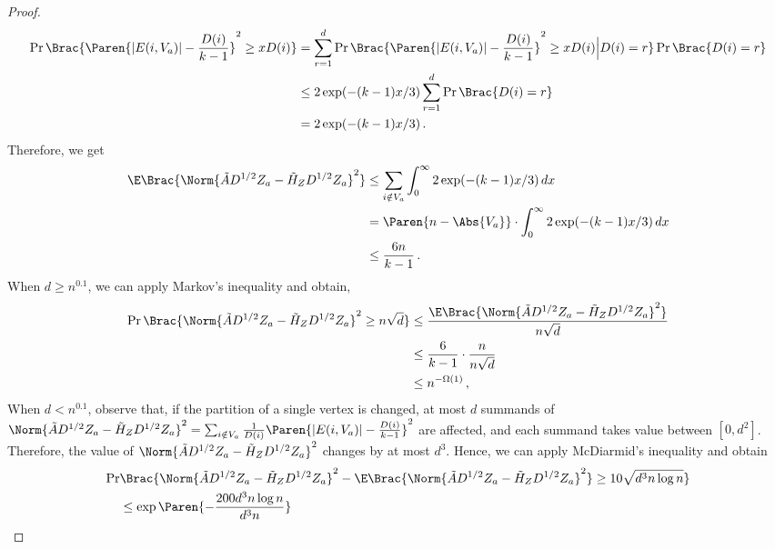 \begin{proof}
    \begin{align*}
        \Pr \Brac{\Paren{|E(i, V_a)| - \frac{D(i)}{k-1}}^2 \geq x D(i)}
        & = \sum_{r=1}^{d} \Pr \Brac{\Paren{|E(i, V_a)| - \frac{D(i)}{k-1}}^2 \geq x D(i) \Big | D(i)=r} \Pr \Brac{D(i)=r} \\
        & \leq 2 \exp(- (k-1)x /3) \sum_{r=1}^{d} \Pr \Brac{D(i)=r} \\
        & = 2 \exp(- (k-1)x /3) \,.
    \end{align*}
    Therefore, we get
    \begin{align*}
        \E \Brac{\Norm{\tilde{A} D^{1/2} Z_a - \tilde{H}_Z D^{1/2} Z_a}^2}
        & \leq \sum_{i \notin V_a} \int_{0}^{\infty} 2 \exp(- (k-1)x /3) \,d x \\
        & = \Paren{n-\Abs{V_a}} \cdot \int_{0}^{\infty} 2 \exp(- (k-1)x /3) \,d x \\
        & \leq \frac{6 n}{k-1} \,.
    \end{align*}
    When $d \geq n^{0.1}$, we can apply Markov's inequality and obtain,
    \begin{align}
    \label{eq:random_planting_subspace_inclusion_4}
    \begin{split}
        \Pr \Brac{\Norm{\tilde{A} D^{1/2} Z_a - \tilde{H}_Z D^{1/2} Z_a}^2 \geq n \sqrt{d}}
        & \leq \frac{\E \Brac{\Norm{\tilde{A} D^{1/2} Z_a - \tilde{H}_Z D^{1/2} Z_a}^2}}{n \sqrt{d}} \\
        & \leq \frac{6}{k-1} \cdot \frac{n}{n \sqrt{d}} \\
        & \leq n^{-\Omega(1)} \,,
    \end{split}
    \end{align}
    When $d < n^{0.1}$, observe that, if the partition of a single vertex is changed, at most $d$ summands of $\Norm{\tilde{A} D^{1/2} Z_a - \tilde{H}_Z D^{1/2} Z_a}^2 = \sum_{i \notin V_a} \frac{1}{D(i)}\Paren{|E(i, V_a)| - \frac{D(i)}{k-1}}^2$ are affected, and each summand takes value between $[0, d^2]$. Therefore, the value of $\Norm{\tilde{A} D^{1/2} Z_a - \tilde{H}_Z D^{1/2} Z_a}^2$ changes by at most $d^3$. Hence, we can apply McDiarmid's inequality and obtain
    \begin{align}
    \label{eq:random_planting_subspace_inclusion_5}
    \begin{split}
        \Pr & \Brac{\Norm{\tilde{A} D^{1/2} Z_a - \tilde{H}_Z D^{1/2} Z_a}^2 - \E \Brac{\Norm{\tilde{A} D^{1/2} Z_a - \tilde{H}_Z D^{1/2} Z_a}^2} \geq 10 \sqrt{d^3 n \log n}} \\
        & \leq \exp \Paren{- \frac{200d^3 n \log n}{d^3 n}}

\end{split}
\end{align}
\end{proof}
